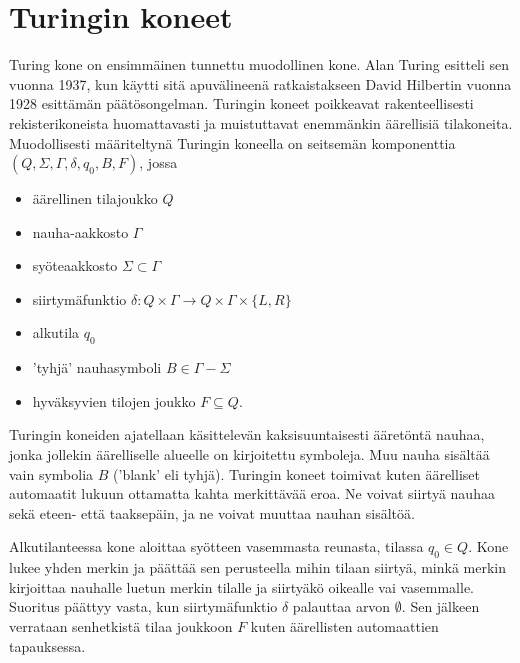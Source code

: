 \documentclass[a4paper, 12pt]{article}
\theoremstyle{definition}
\theoremstyle{plain}
\begin{document}
\section{Turingin koneet}
Turing kone on ensimmäinen tunnettu muodollinen kone. Alan Turing esitteli sen vuonna 1937, kun käytti sitä apuvälineenä ratkaistakseen David Hilbertin vuonna 1928 esittämän päätösongelman.
Turingin koneet poikkeavat rakenteellisesti rekisterikoneista huomattavasti ja muistuttavat enemmänkin äärellisiä tilakoneita. Muodollisesti määriteltynä Turingin koneella on seitsemän komponenttia $(Q, \Sigma, \Gamma, \delta, q_0, B, F)$, jossa

\begin{itemize}
\item äärellinen tilajoukko $Q$
\item nauha-aakkosto $\Gamma$
\item syöteaakkosto $\Sigma \subset \Gamma$
\item siirtymäfunktio $\delta : Q \times \Gamma \rightarrow Q \times \Gamma \times \{L,R\}$
\item alkutila $q_0$
\item 'tyhjä' nauhasymboli $B \in \Gamma - \Sigma$
\item hyväksyvien tilojen joukko $F \subseteq Q.$
\end{itemize}

Turingin koneiden ajatellaan käsittelevän kaksisuuntaisesti ääretöntä nauhaa, jonka jollekin äärelliselle alueelle on kirjoitettu symboleja. Muu nauha sisältää vain symbolia $B$ ('blank' eli tyhjä).
Turingin koneet toimivat kuten äärelliset automaatit lukuun ottamatta kahta merkittävää eroa. Ne voivat siirtyä nauhaa sekä eteen- että taaksepäin, ja ne voivat muuttaa nauhan sisältöä.

Alkutilanteessa kone aloittaa syötteen vasemmasta reunasta, tilassa $q_0 \in Q$. Kone lukee yhden merkin ja päättää sen perusteella mihin tilaan siirtyä, minkä merkin kirjoittaa nauhalle luetun merkin tilalle ja siirtyäkö oikealle vai vasemmalle. Suoritus päättyy vasta, kun siirtymäfunktio $\delta$ palauttaa arvon $\emptyset$. Sen jälkeen verrataan senhetkistä tilaa joukkoon $F$ kuten äärellisten automaattien tapauksessa.
\end{document}
